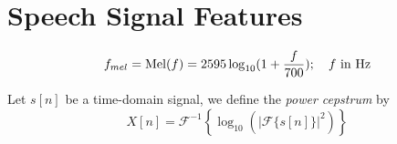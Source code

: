 \chapter{Speech Signal Features}
\label{chapter:speech-feature}

\begin{equation}
\label{eq:mel-function}
f_{mel} = \operatorname{Mel}(f) = 2595 \log_{10} (1 + \frac{f}{700}); \quad f \text{ in Hz}
\end{equation}

Let $s[n]$ be a time-domain signal, we define the \textit{power cepstrum} by
\begin{equation}
\label{eq:time-domain-to-cepstrum}
X[n] = \mathcal{F}^{-1} \left\{\log_{10} \left( |\mathcal{F}\{s[n]\}|^2 \right) \right\}
\end{equation}
